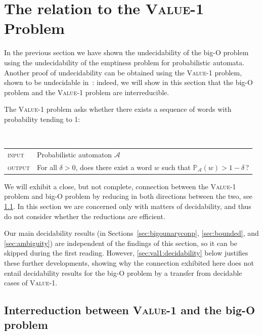 \documentclass{lmcs}
\theoremstyle{plain}
\theoremstyle{definition}
\theoremstyle{remark}
\newcommand\pr{\mathbb{P}}
\begin{document}
\section{The relation to the \textsc{Value-1} Problem}\label{append:rel-val1}

In the previous section we have shown the undecidability of the big-O problem using the undecidability of the emptiness problem for probabilistic automata. Another proof of undecidability can be obtained using the \textsc{Value-1} problem, shown to be undecidable in~\cite{DBLP:conf/icalp/GimbertO10}: indeed, we will show in this section that the big-O problem and the \textsc{Value-1} problem are interreducible.

The \textsc{Value-1} problem asks whether there exists a sequence of words with probability tending to 1:

\medskip

\begin{defi}~\\
\begin{tabular}{ll}
\textsc{input} & Probabilistic automaton $\mathcal{A}$\\
\textsc{output} & For all $\delta > 0$, does there exist a word $w$ such that $\pr_\mathcal{A}(w) > 1-\delta$\,?
\end{tabular}
\end{defi}

\noindent We will exhibit a close, but not complete, connection between the \textsc{Value-1} problem and big-O problem by reducing in both directions between the two, see \cref{sec:val1:interreduction}.
In this section we are concerned only with matters of decidability, and thus do not consider whether the reductions are efficient.

Our main decidability results
(in Sections~\ref{sec:bigounaryconp}, \ref{sec:bounded}, and \ref{sec:ambiguity})
are independent of the findings of this section, so it can be skipped during the first reading.
However, \cref{sec:val1:decidability} below justifies these further developments,
showing why the connection exhibited here
does not entail decidability results for the big-O problem by a transfer
from decidable cases of \textsc{Value-1}.

\pagebreak
\subsection{Interreduction between \textsc{Value-1} and the big-O problem}\label{sec:val1:interreduction}
\end{document}
